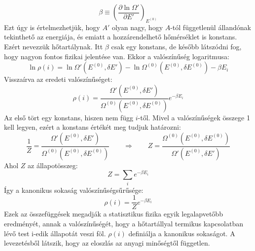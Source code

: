 \documentclass[../main.tex]{subfiles}
\begin{document}
\begin{equation}
    \beta \equiv \left( \frac{\partial \ln \Omega'}{\partial E'} \right)_{E^{(0)}}
\end{equation}
Ezt úgy is értelmezhetjük, hogy $A'$ olyan nagy, hogy $A$-tól függetlenül állandónak tekinthető az energiája, és emiatt a hozzárendelhető hőmérséklet is konstans. Ezért nevezzük hőtartálynak. Itt $\beta$ csak egy konstans,
de később látszódni fog, hogy nagyon fontos fizikai jelentése van. Ekkor a valószínűség logaritmusa:
\begin{equation}
    \ln \rho(i) = \ln \Omega' (E^{(0)}, \delta E') - \ln \Omega^{(0)} (E^{(0)}, \delta E^{(0)}) - \beta E_i
\end{equation}
Visszaírva az eredeti valószínűséget:
\begin{equation}
    \rho(i) = \frac{\Omega' (E^{(0)}, \delta E')}{\Omega^{(0)} (E^{(0)}, \delta E^{(0)})} e^{-\beta E_i}
\end{equation}
Az első tört egy konstans, hiszen nem függ $i$-től. Mivel a valószínűségek összege 1 kell legyen, ezért a konstans értékét meg tudjuk határozni:
\begin{equation}
    \frac{1}{Z} = \frac{\Omega' (E^{(0)}, \delta E')}{\Omega^{(0)} (E^{(0)}, \delta E^{(0)})} \qquad \Rightarrow \qquad Z = \frac{\Omega^{(0)} (E^{(0)}, \delta E^{(0)})}{\Omega' (E^{(0)}, \delta E')}
\end{equation}
Ahol $Z$ az állapotösszeg:
\begin{equation}
    Z = \sum_i e^{-\beta E_i}
\end{equation}
Így a kanonikus sokaság valószínűségsűrűsége:
\begin{equation}
    \boxed{\rho(i) = \frac{1}{Z} e^{-\beta E_i}} 
\end{equation}
Ezek az összefüggések megadják a statisztikus fizika egyik legalapvetőbb eredményét, annak a valószínűségét, hogy a hőtartállyal termikus kapcsolatban lévő test i-edik állapotát veszi föl.
$\rho(i)$ definiálja a kanonikus sokaságot. A levezetésből látszik, hogy az eloszlás az anyagi minőségtől független.
\end{document}
